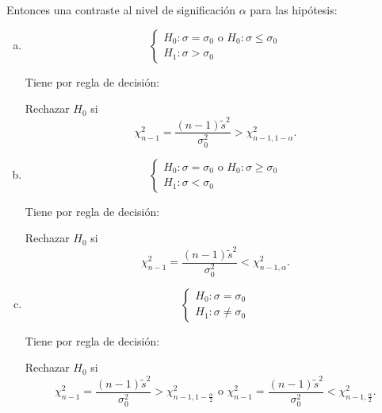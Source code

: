 \documentclass[12pt]{report}
\begin{document}
        Entonces una contraste al nivel de significación $\alpha$ para las
    hipótesis:
\begin{enumerate} [a)]
\item $$\left\{\begin{array}{l}
    H_{0}:\sigma=\sigma_{0} \mbox{ o } H_{0}:\sigma\leq \sigma_{0}\\
    H_{1}:\sigma>\sigma_{0}
    \end{array}\right.$$


    Tiene por regla de decisión:

    Rechazar $H_{0}$ si
    $$\chi_{n-1}^2=\frac{(n-1) \tilde{s}^2}{\sigma_{0}^2}>\chi_{n-1,1-\alpha}^2.$$


 \item $$\left\{\begin{array}{l}
    H_{0}:\sigma=\sigma_{0} \mbox{ o } H_{0}:\sigma\geq \sigma_{0}\\
    H_{1}:\sigma<\sigma_{0}
    \end{array}\right.$$


    Tiene por regla de decisión:

    Rechazar $H_{0}$ si
    $$\chi_{n-1}^2=\frac{(n-1) \tilde{s}^2}{\sigma_{0}^2}<\chi_{n-1,\alpha}^2.$$

\item $$\left\{\begin{array}{l}
    H_{0}:\sigma=\sigma_{0} \\
    H_{1}:\sigma\not=\sigma_{0}
    \end{array}\right.$$


    Tiene por regla de decisión:

    Rechazar $H_{0}$ si  
    $$\chi_{n-1}^2=\frac{(n-1)
    \tilde{s}^2}{\sigma_{0}^2}>\chi_{n-1,1-\frac{\alpha}{2}}^2 \mbox{ o }\chi_{n-1}^2=\frac{(n-1)
    \tilde{s}^2}{\sigma_{0}^2}<\chi_{n-1,\frac{\alpha}{2}}^2.$$
\end{enumerate}
\end{document}
